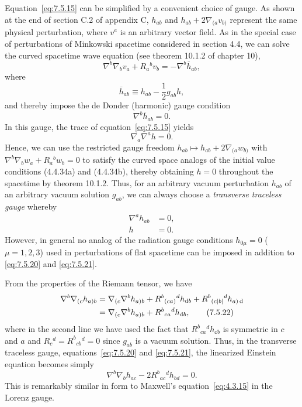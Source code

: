 Equation~\eqref{eq:7.5.15} can be simplified by a convenient choice of gauge. As
shown at the end of section C.2 of appendix C, \(h_{ab}\) and
\(h_{ab}+2\nabla_{(a}v_{b)}\) represent the same physical perturbation, where
\(v^a\) is an arbitrary vector field. As in the special case of perturbations of
Minkowski spacetime considered in section 4.4, we can solve the curved spacetime
wave equation (see theorem 10.1.2 of chapter 10),
\begin{equation}
  \nabla^b\nabla_bv_a+R_a{}^bv_b=-\nabla^b\overline h_{ab} ,
  \tag{7.5.16}\label{eq:7.5.16}
\end{equation}
where
\begin{equation}
  \overline h_{ab}\equiv h_{ab}-\frac12g_{ab}h ,
  \tag{7.5.17}\label{eq:7.5.17}
\end{equation}
and thereby impose the de Donder (harmonic) gauge condition
\begin{equation}
  \nabla^b\overline h_{ab}=0 .
  \tag{7.5.18}\label{eq:7.5.18}
\end{equation}
In this gauge, the trace of equation~\eqref{eq:7.5.15} yields
\begin{equation}
  \nabla_a\nabla^ah=0 .
  \tag{7.5.19}\label{eq:7.5.19}
\end{equation}
Hence, we can use the restricted gauge freedom
\(h_{ab}\longmapsto h_{ab}+2\nabla_{(a}w_{b)}\) with
\(\nabla^b\nabla_bw_a+R_a{}^bw_b=0\) to satisfy the curved space analogs of the
initial value conditions (4.4.34a) and (4.4.34b), thereby obtaining \(h=0\)
throughout the spacetime by theorem 10.1.2. Thus, for an arbitrary vacuum
perturbation \(h_{ab}\) of an arbitrary vacuum solution \(g_{ab}\), we can always
choose a \emph{transverse traceless gauge} whereby
\begin{align}
  \nabla^ah_{ab}&=0 ,
  \tag{7.5.20}\label{eq:7.5.20}\\
  h&=0 .
  \tag{7.5.21}\label{eq:7.5.21}
\end{align}
However, in general no analog of the radiation gauge conditions
\(h_{0\mu}=0\) (\(\mu=1,2,3\)) used in perturbations of flat spacetime can be
imposed in addition to \eqref{eq:7.5.20} and \eqref{eq:7.5.21}.

From the properties of the Riemann tensor, we have
\begin{align}
  \nabla^b\nabla_{(c}h_{a)b}
    &=\nabla_{(c}\nabla^bh_{a)b}
      +R^b{}_{(ca)}{}^dh_{\mathop{}\!\mathrm{d} b}
      +R^b{}_{(c|b|}{}^dh_{a)\mathop{}\!\mathrm{d}} \notag\\
    &=\nabla_{(c}\nabla^bh_{a)b}
      +R^b{}_{ca}{}^dh_{\mathop{}\!\mathrm{d} b} ,
  \tag{7.5.22}\label{eq:7.5.22}
\end{align}
where in the second line we have used the fact that
\(R^b{}_{ca}{}^dh_{\dd b}\) is symmetric in \(c\) and \(a\) and
\(R_c{}^d=R^b{}_{cb}{}^d=0\) since \(g_{ab}\) is a vacuum solution. Thus, in
the transverse traceless gauge, equations~\eqref{eq:7.5.20} and
\eqref{eq:7.5.21}, the linearized Einstein equation becomes simply
\begin{equation}
  \nabla^b\nabla_bh_{ac}-2R^b{}_{ac}{}^dh_{bd}=0 .
  \tag{7.5.23}\label{eq:7.5.23}
\end{equation}
This is remarkably similar in form to Maxwell's equation~\eqref{eq:4.3.15} in the
Lorenz gauge.


